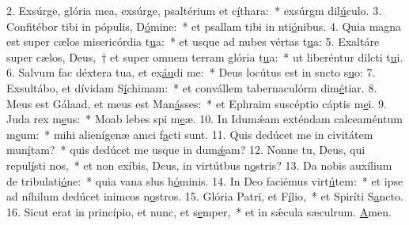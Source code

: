 2. Exsúrge, glória mea, exsúrge, psaltérium et c\uline{í}thara:~* exsúrgm dil\uline{ú}culo.
3. Confitébor tibi in pópulis, D\uline{ó}mine:~* et psallam tibi in nti\uline{ó}nibus.
4. Quia magna est super cælos misericórdia t\uline{u}a:~* et usque ad nubes vértas t\uline{u}a:
5. Exaltáre super cælos, Deus,~† et super omnem terram glória t\uline{u}a:~* ut liberéntur dilcti t\uline{u}i.
6. Salvum fac déxtera tua, et ex\uline{áu}di me:~* Deus locútus est in sncto s\uline{u}o:
7. Exsultábo, et dívidam S\uline{í}chimam:~* et convállem tabernaculórm dim\uline{é}tiar.
8. Meus est Gálaad, et meus est Man\uline{á}sses:~* et Ephraim suscéptio cáptis m\uline{e}i.
9. Juda rex m\uline{e}us:~* Moab lebes spi m\uline{e}æ.
10. In Idumǽam exténdam calceaméntum m\uline{e}um:~* mihi alienígenæ amci f\uline{a}cti sunt.
11. Quis dedúcet me in civitátem mun\uline{í}tam?~* quis dedúcet me usque in dum\uline{ǽ}am?
12. Nonne tu, Deus, qui repul\uline{í}sti nos,~* et non exíbis, Deus, in virtútbus n\uline{o}stris?
13. Da nobis auxílium de tribulati\uline{ó}ne:~* quia vana slus h\uline{ó}minis.
14. In Deo faciémus virt\uline{ú}tem:~* et ipse ad níhilum dedúcet inimcos n\uline{o}stros.
15. Glória Patri, et F\uline{í}lio,~* et Spiríti S\uline{a}ncto.
16. Sicut erat in princípio, et nunc, et s\uline{e}mper,~* et in sǽcula sæculrum. \uline{A}men.
